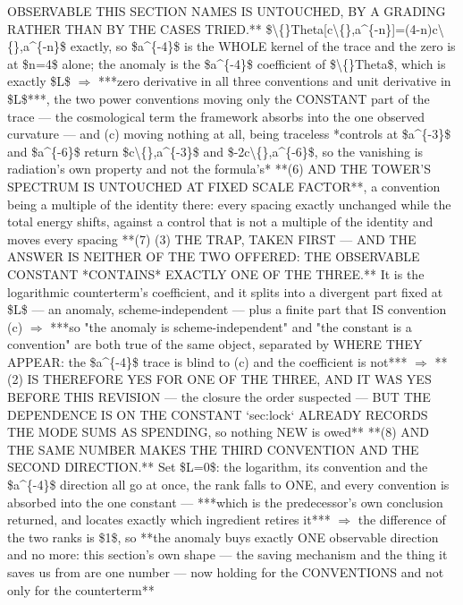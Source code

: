 \begin{description}
OBSERVABLE THIS SECTION NAMES IS UNTOUCHED, BY A GRADING RATHER THAN BY THE CASES TRIED.** \$\textbackslash\{\}Theta[c\textbackslash\{\},a\textasciicircum{}\{-n\}]=(4-n)c\textbackslash\{\},a\textasciicircum{}\{-n\}\$ exactly, so \$a\textasciicircum{}\{-4\}\$ is the WHOLE kernel of the trace and the zero is at \$n=4\$ alone; the anomaly is the \$a\textasciicircum{}\{-4\}\$ coefficient of \$\textbackslash\{\}Theta\$, which is exactly \$L\$ \ensuremath{\Rightarrow} ***zero derivative in all three conventions and unit derivative in \$L\$***, the two power conventions moving only the CONSTANT part of the trace --- the cosmological term the framework absorbs into the one observed curvature --- and (c) moving nothing at all, being traceless  *controls at \$a\textasciicircum{}\{-3\}\$ and \$a\textasciicircum{}\{-6\}\$ return \$c\textbackslash\{\},a\textasciicircum{}\{-3\}\$ and \$-2c\textbackslash\{\},a\textasciicircum{}\{-6\}\$, so the vanishing is radiation's own property and not the formula's*  **(6) AND THE TOWER'S SPECTRUM IS UNTOUCHED AT FIXED SCALE FACTOR**, a convention being a multiple of the identity there: every spacing exactly unchanged while the total energy shifts, against a control that is not a multiple of the identity and moves every spacing  **(7)  (3) THE TRAP, TAKEN FIRST --- AND THE ANSWER IS NEITHER OF THE TWO OFFERED: THE OBSERVABLE CONSTANT *CONTAINS* EXACTLY ONE OF THE THREE.** It is the logarithmic counterterm's coefficient, and it splits into a divergent part fixed at \$L\$ --- an anomaly, scheme-independent --- plus a finite part that IS convention (c) \ensuremath{\Rightarrow} ***so "the anomaly is scheme-independent" and "the constant is a convention" are both true of the same object, separated by WHERE THEY APPEAR: the \$a\textasciicircum{}\{-4\}\$ trace is blind to (c) and the coefficient is not*** \ensuremath{\Rightarrow} **(2) IS THEREFORE YES FOR ONE OF THE THREE, AND IT WAS YES BEFORE THIS REVISION --- the closure the order suspected --- BUT THE DEPENDENCE IS ON THE CONSTANT `sec:lock` ALREADY RECORDS THE MODE SUMS AS SPENDING, so nothing NEW is owed**  **(8)  AND THE SAME NUMBER MAKES THE THIRD CONVENTION AND THE SECOND DIRECTION.** Set \$L=0\$: the logarithm, its convention and the \$a\textasciicircum{}\{-4\}\$ direction all go at once, the rank falls to ONE, and every convention is absorbed into the one constant --- ***which is the predecessor's own conclusion returned, and locates exactly which ingredient retires it*** \ensuremath{\Rightarrow} the difference of the two ranks is \$1\$, so **the anomaly buys exactly ONE observable direction and no more: this section's own shape --- the saving mechanism and the thing it saves us from are one number --- now holding for the CONVENTIONS and not only for the counterterm**

\end{description}
